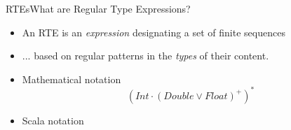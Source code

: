 \newsavebox\exnotebox
\begin{lrbox}{\exnotebox}
  \begin{minipage}{7cm}
    
  \end{minipage}
\end{lrbox}


\begin{frame}{RTEs}{What are Regular Type Expressions?}
  \begin{itemize}
  \item An RTE is an \emph{expression} designating a set  of finite sequences
  \item ... based on regular patterns in the \emph{types} of their content.
  \item Mathematical notation
    \[(Int \cdot (Double \vee Float)^+)^*\]
  \item Scala notation\\
    \usebox\exnotebox
  \end{itemize}
\end{frame}
